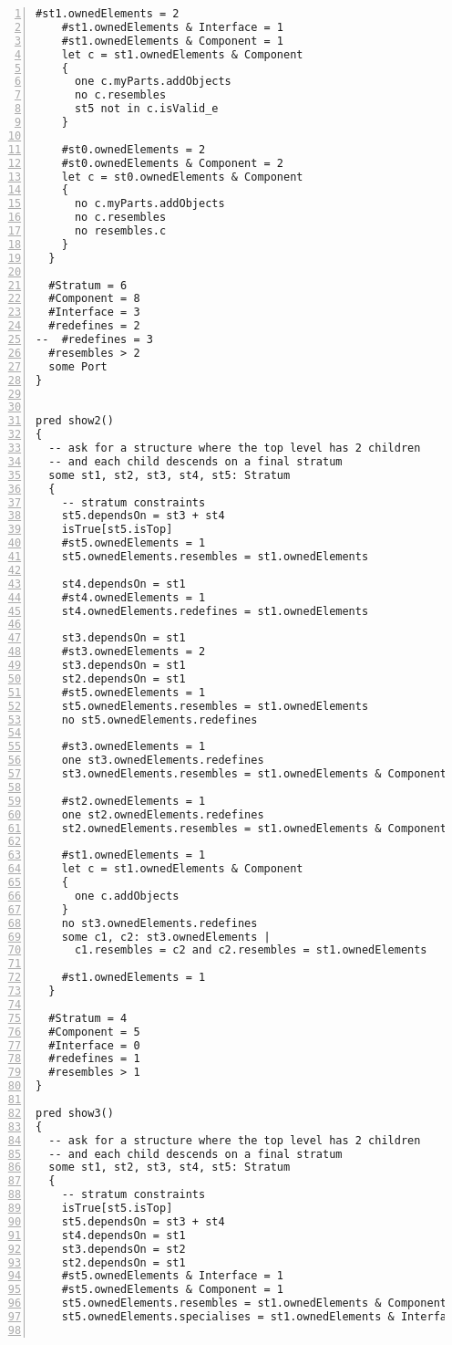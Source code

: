 \begin{lstlisting}[caption={test.als}, numbers=left]
    #st1.ownedElements = 2
    #st1.ownedElements & Interface = 1
    #st1.ownedElements & Component = 1
    let c = st1.ownedElements & Component
    {
      one c.myParts.addObjects
      no c.resembles
      st5 not in c.isValid_e      
    }

    #st0.ownedElements = 2
    #st0.ownedElements & Component = 2
    let c = st0.ownedElements & Component
    {
      no c.myParts.addObjects
      no c.resembles
      no resembles.c
    }
  }

  #Stratum = 6
  #Component = 8
  #Interface = 3
  #redefines = 2
--  #redefines = 3
  #resembles > 2
  some Port
}


pred show2()
{
  -- ask for a structure where the top level has 2 children
  -- and each child descends on a final stratum
  some st1, st2, st3, st4, st5: Stratum
  {
    -- stratum constraints
    st5.dependsOn = st3 + st4
    isTrue[st5.isTop]
    #st5.ownedElements = 1
    st5.ownedElements.resembles = st1.ownedElements
    
    st4.dependsOn = st1
    #st4.ownedElements = 1
    st4.ownedElements.redefines = st1.ownedElements

    st3.dependsOn = st1
    #st3.ownedElements = 2
    st3.dependsOn = st1
    st2.dependsOn = st1
    #st5.ownedElements = 1
    st5.ownedElements.resembles = st1.ownedElements
    no st5.ownedElements.redefines
    
    #st3.ownedElements = 1
    one st3.ownedElements.redefines
    st3.ownedElements.resembles = st1.ownedElements & Component

    #st2.ownedElements = 1
    one st2.ownedElements.redefines
    st2.ownedElements.resembles = st1.ownedElements & Component
    
    #st1.ownedElements = 1
    let c = st1.ownedElements & Component
    {
      one c.addObjects
    }
    no st3.ownedElements.redefines
    some c1, c2: st3.ownedElements |
      c1.resembles = c2 and c2.resembles = st1.ownedElements

    #st1.ownedElements = 1
  }
  
  #Stratum = 4
  #Component = 5
  #Interface = 0
  #redefines = 1
  #resembles > 1
}

pred show3()
{
  -- ask for a structure where the top level has 2 children
  -- and each child descends on a final stratum
  some st1, st2, st3, st4, st5: Stratum
  {
    -- stratum constraints
    isTrue[st5.isTop]
    st5.dependsOn = st3 + st4
    st4.dependsOn = st1
    st3.dependsOn = st2
    st2.dependsOn = st1
    #st5.ownedElements & Interface = 1
    #st5.ownedElements & Component = 1
    st5.ownedElements.resembles = st1.ownedElements & Component
    st5.ownedElements.specialises = st1.ownedElements & Interface
    

\end{lstlisting}
